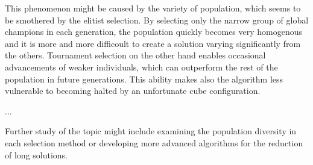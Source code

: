 \documentclass[a4paper]{article}
\begin{document}
This phenomenon might be caused by the variety of population, which seems to be smothered by the elitist selection. By selecting only the narrow group of global champions in each generation, the population quickly becomes very homogenous and it is more and more difficoult to create a solution varying significantly from the others. Tournament selection on the other hand enables occasional advancements of weaker individuals, which can outperform the rest of the population in future generations. This ability makes also the algorithm less vulnerable to becoming halted by an unfortunate cube configuration.

... 

Further study of the topic might include examining the population diversity in each selection method or developing more advanced algorithms for the reduction of long solutions.
\end{document}
